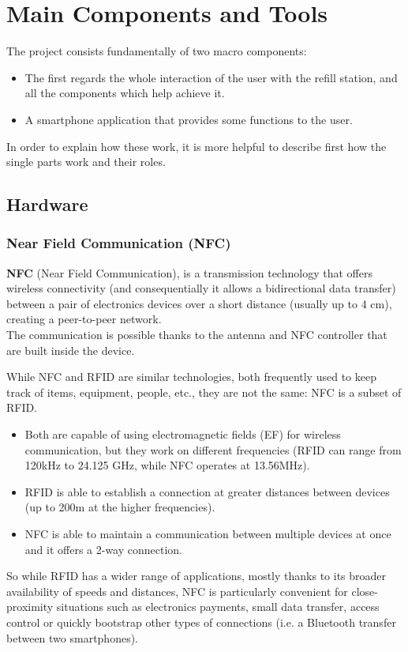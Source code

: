 \documentclass[target=bach,aauheader=,style=]{thud}
\begin{document}
\chapter{Main Components and Tools}

The project consists fundamentally of two macro components:
\begin{itemize}
	\item The first regards the whole interaction of the user with the refill station, and all the components which help achieve it.
	\item A smartphone application that provides some functions to the user.
\end{itemize}

In order to explain how these work, it is more helpful to describe first how the single parts work and their roles.

\section{Hardware}
\subsection{Near Field Communication (NFC)}

\textbf{NFC} (Near Field Communication), is a transmission technology that offers wireless connectivity (and consequentially it allows a bidirectional data transfer) between a pair of electronics devices over a short distance (usually up to 4 cm), creating a peer-to-peer network. \\The communication is possible thanks to the antenna and NFC controller that are built inside the device.\par

While NFC and RFID are similar technologies, both frequently used to keep track of items, equipment, people, etc., they are not the same: NFC is a subset of RFID. 
\begin{itemize}
	\item Both are capable of using electromagnetic fields (EF) for wireless communication, but they work on different frequencies (RFID can range from 120kHz to 24.125 GHz, while NFC operates at 13.56MHz).
	\item RFID is able to establish a connection at greater distances between devices (up to 200m at the higher frequencies).
	\item NFC is able to maintain a communication between multiple devices at once and it offers a 2-way connection.
\end{itemize}
\pagebreak
So while RFID has a wider range of applications, mostly thanks to its broader availability of speeds and distances, NFC is particularly convenient for close-proximity situations such as electronics payments, small data transfer, access control or quickly bootstrap other types of connections (i.e. a Bluetooth transfer between two smartphones).\par
\end{document}
